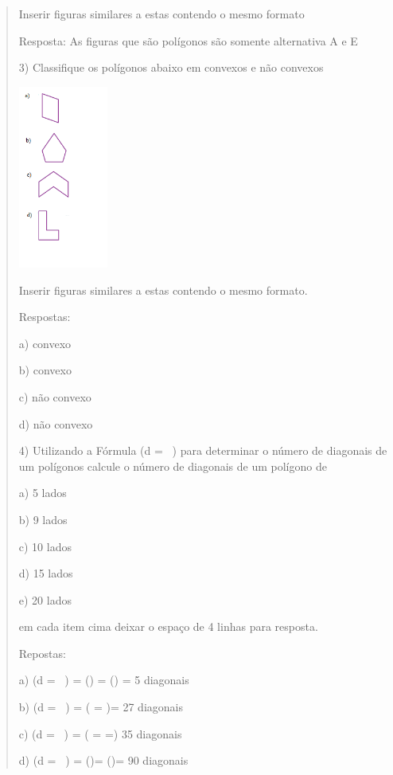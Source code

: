 \begin{quote}
\begin{escolha}
Inserir figuras similares a estas contendo o mesmo formato

Resposta: As figuras que são polígonos são somente alternativa A e E

3) Classifique os polígonos abaixo em convexos e não convexos

\includegraphics[width=1.16236in,height=2.36667in]{./imgSAEB_8_MAT/media/image8.png}

Inserir figuras similares a estas contendo o mesmo formato.

Respostas:

a) convexo

b) convexo

c) não convexo

d) não convexo

4) Utilizando a Fórmula (d = \ ) para determinar o
número de diagonais de um polígonos calcule o número de diagonais de um
polígono de

a) 5 lados

b) 9 lados

c) 10 lados

d) 15 lados

e) 20 lados

em cada item cima deixar o espaço de 4 linhas para resposta.

Repostas:


a) (d = \ ) = () =
() = 5 diagonais

b) (d = \ ) = ( = )=
27 diagonais

c) (d = \ ) =
( =  =) 35 diagonais

d) (d = \ ) = ()=
()= 90 diagonais


\end{escolha}
\end{quote}
